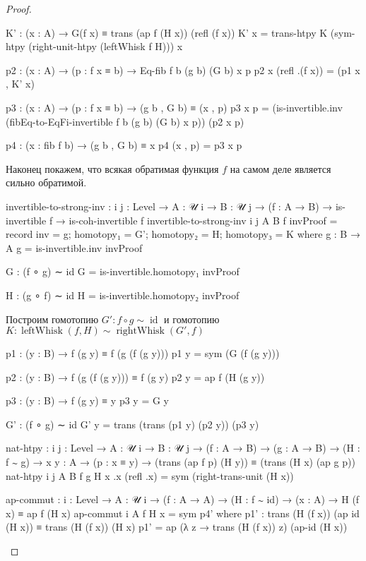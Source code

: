 \documentclass{article}[12pt]
\newcommand{\op}{\operatorname}
\begin{document}
\begin{proof}
\begin{code}
        K' : (x : A) → G(f x) ≡ trans (ap f (H x)) (refl (f x))
        K' x = trans-htpy K (sym-htpy (right-unit-htpy (leftWhisk f H))) x

        p2 : (x : A) → (p : f x ≡ b) → Eq-fib f b (g b) (G b) x p
        p2 x (refl .(f x)) = (p1 x , K' x)

        p3 : (x : A) → (p : f x ≡ b) → (g b , G b) ≡ (x , p)
        p3 x p = (is-invertible.inv (fibEq-to-EqFi-invertible f b (g b) (G b) x p)) (p2 x p)

        p4 : (x : fib f b) → (g b , G b) ≡ x
        p4 (x , p) = p3 x p
\end{code}

Наконец покажем, что всякая обратимая функция $f$ на самом деле является сильно обратимой.
\begin{code}
invertible-to-strong-inv : {i j : Level} → {A : 𝒰 i} → {B : 𝒰 j} → (f : A → B) 
                           → is-invertible f 
                           → is-coh-invertible f
invertible-to-strong-inv {i} {j} {A} {B} f invProof = 
    record {inv = g;
            homotopy₁ = G';
            homotopy₂ = H;
            homotopy₃ = K}
    where
        g : B → A
        g = is-invertible.inv invProof

        G : (f ∘ g) ∼ id
        G = is-invertible.homotopy₁ invProof

        H : (g ∘ f) ∼ id
        H = is-invertible.homotopy₂ invProof
\end{code}
Построим гомотопию $G' : f \circ g \sim \op{id}$ и гомотопию 
$K : \op{leftWhisk}(f, H) \sim \op{rightWhisk}(G', f)$
\begin{code}
        p1 : (y : B) → f (g y) ≡ f (g (f (g y)))
        p1 y = sym (G (f (g y)))

        p2 : (y : B) → f (g (f (g y))) ≡ f (g y)
        p2 y = ap f (H (g y))

        p3 : (y : B) → f (g y) ≡ y
        p3 y = G y

        G' : (f ∘ g) ∼ id
        G' y = trans (trans (p1 y) (p2 y)) (p3 y)

        nat-htpy : {i j : Level} → {A : 𝒰 i} → {B : 𝒰 j}
                   → (f : A → B)
                   → (g : A → B)
                   → (H : f ∼ g)
                   → {x y : A}
                   → (p : x ≡ y)
                   → (trans (ap f p) (H y)) ≡ (trans (H x) (ap g p))
        nat-htpy {i} {j} {A} {B} f g H {x} {.x} (refl .x) = sym (right-trans-unit (H x))

        ap-commut : {i : Level} → {A : 𝒰 i}
                    → (f : A → A)
                    → (H : f ∼ id)
                    → (x : A)
                    → H (f x) ≡ ap f (H x)
        ap-commut {i} {A} f H x = sym p4'
            where
                p1' : trans (H (f x)) (ap id (H x)) ≡ trans (H (f x)) (H x)
                p1' = ap (λ z → trans (H (f x)) z) (ap-id (H x))


\end{code}
\end{proof}
\end{document}
